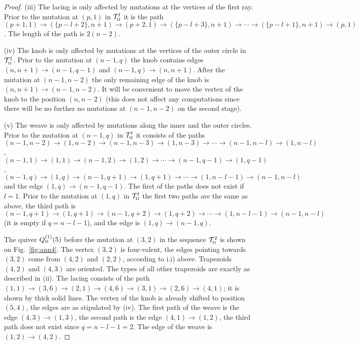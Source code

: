 \documentclass{amsart}
\theoremstyle{definition}
\theoremstyle{remark}
\numberwithin{equation}{section}
\numberwithin{theorem}{section}
\begin{document}
\begin{proof}
(iii) The lacing is only affected by mutations at the vertices of the first ray. Prior to the mutation 
at $(p,1)$ in ${{\mathcal T}}^l_{\mbox{\tiny\rm II}}$ it is the path
$(p+1,1)\to (\{p-l+2\},n+1)\to (p+2,1)\to (\{p-l+3\},n+1)\to\cdots
\to (\{p-l+1\},n+1)\to (p,1)$.
The length of the path is $2(n-2)$.

(iv) The knob is only affected by mutations at the vertices of the outer circle in ${{\mathcal T}}^1_{\mbox{\tiny\rm II}}$. 
Prior to the mutation at $(n-1,q)$ the knob contains
 edges $(n,n+1)\to (n-1,q-1)$ and $(n-1,q)\to (n,n+1)$.
After the mutation at $(n-1,n-2)$ the only remaining edge of the knob is  $(n,n+1)\to (n-1,n-2)$.
It will be convenient to move the vertex of the knob
to the position $(n,n-2)$ (this does not affect any computations
since there will be no further no mutations at $(n-1,n-2)$ on the second stage). 

 
(v) The weave is only affected by mutations along the inner and the outer circles. Prior to the mutation
at $(n-1,q)$ in ${{\mathcal T}}^l_{\mbox{\tiny\rm II}}$ it consists of the paths
$(n-1,n-2)\to (1,n-2) \to (n-1,n-3) \to (1,n-3)\to \cdots \to (n-1,n-l) \to (1,n-l)$,
$(n-1,1)\to(1,1)\to (n-1,2) \to (1,2)\to \cdots \to (n-1,q-1) \to (1,q-1)$,
$(n-1,q)\to(1,q)\to (n-1,q+1) \to (1,q+1)\to\cdots \to (1,n-l-1) \to (n-1,n-l)$
and the edge $(1,q)\to (n-1,q-1)$. The first of the paths does not exist if $l=1$.  
Prior to the mutation at $(1,q)$ in ${{\mathcal T}}^l_{\mbox{\tiny\rm II}}$ the first two paths are the same as above, 
the third path is
$(n-1,q+1)\to(1,q+1)\to (n-1,q+2) \to (1,q+2)\to\cdots \to (1,n-l-1) \to (n-1,n-l)$
(it is empty if $q=n-l-1$), and 
the edge is $(1,q)\to (n-1,q)$. 

The quiver $Q_{\mbox{\tiny\rm II}}^{(1)}(5)$ before the mutation at $(3,2)$ in the sequence ${{\mathcal T}}^2_{\mbox{\tiny\rm II}}$ is shown on Fig.~\ref{fig:ann4}.
The vertex $(3,2)$ is four-valent, the edges pointing towards $(3,2)$ come from $(4,2)$ and $(2,2)$, according to i.i) above. 
Trapezoids $(4,2)$ and $(4,3)$
are oriented. The types of all other trapezoids are exactly as described in (ii). 
The lacing consists of the path $(1,1)\to(3,6)\to(2,1)\to(4,6)\to(3,1)\to(2,6)\to(4,1)$; it is shown by thick solid lines. The vertex of the knob is already shifted to position $(5,4)$, the edges are as stipulated by
(iv). The first path of the weave is the edge $(4,3)\to(1,3)$, the second path is the edge $(4,1)\to(1,2)$, the 
third path does not exist since $q=n-l-1=2$. The edge of the weave is $(1,2)\to(4,2)$.


\end{proof}
\end{document}
